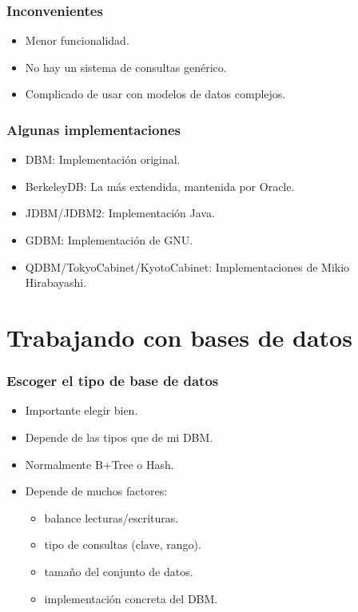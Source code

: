 \documentclass[10pt]{beamer}
\begin{document}
  \begin{frame}
    \frametitle{Inconvenientes}
  
    \begin{itemize}
      \item Menor funcionalidad.
      \item No hay un sistema de consultas genérico.
      \item Complicado de usar con modelos de datos complejos.
    \end{itemize}
  \end{frame}

  \begin{frame}[containsverbatim]
    \frametitle{Algunas implementaciones}
    \begin{itemize}
      \item DBM: Implementación original.
      \item BerkeleyDB: La más extendida, mantenida por Oracle.
      \item JDBM/JDBM2: Implementación Java.
      \item GDBM: Implementación de GNU.
      \item QDBM/TokyoCabinet/KyotoCabinet: Implementaciones de Mikio Hirabayashi.
    \end{itemize}
  \end{frame}

  \section*{Trabajando con bases de datos}

  \begin{frame}[containsverbatim]
    \frametitle{Escoger el tipo de base de datos}
    \begin{itemize}
      \item Importante elegir bien.
      \item Depende de las tipos que de mi DBM.
      \item Normalmente B+Tree o Hash.
      \item Depende de muchos factores:
      \begin{itemize}
        \item balance lecturas/escrituras.
        \item tipo de consultas (clave, rango).
        \item tamaño del conjunto de datos.
        \item implementación concreta del DBM.
      \end{itemize}
    \end{itemize}
  \end{frame}
\end{document}
